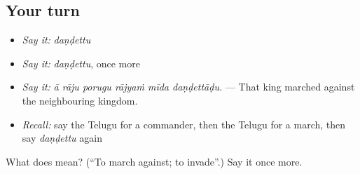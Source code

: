 \subsection*{Your turn}
\begin{itemize}
\raggedright
  \item \emph{Say it:} \emph{daṇḍettu}
  \item \emph{Say it:} \emph{daṇḍettu}, once more
  \item \emph{Say it:} \emph{ā rāju porugu rājyaṁ mīda daṇḍettāḍu.} — That king marched against the neighbouring kingdom.
  \item \emph{Recall:} say the Telugu for a commander, then the Telugu for a march, then say \emph{daṇḍettu} again
\end{itemize}

\begin{tcolorbox}[breakable,colback=teal!4,colframe=teal!35!black,title={Before you move on}]
What does  mean? (\textquotedblleft{}To march against; to invade\textquotedblright{}.) Say it once more.
\end{tcolorbox}

